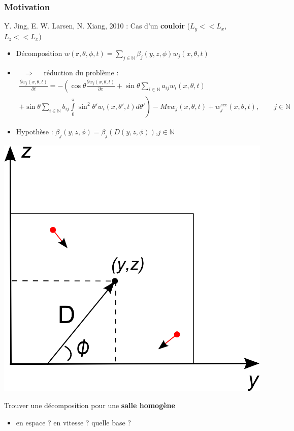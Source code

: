 \begin{frame}
\frametitle{Motivation}
Y. Jing, E. W. Larsen, N. Xiang, 2010 : Cas d'un \textbf{couloir} ($L_y<<L_x$, $L_z<<L_x$)
\begin{itemize}
\item Décomposition $w(\textbf{r}, \theta, \phi, t)=\sum\limits_{j\in\mathbb{N}}\beta_j(y,z,\phi)w_j(x,\theta,t)$ 
\item $\quad\Rightarrow\quad$ réduction du problème : 
\begin{multline*}
\frac{\partial w_{j}(x,\theta,t)}{\partial t}=-\left(\cos{\theta}\frac{\partial w_{j}(x,\theta,t)}{\partial x}+\sin{\theta}\sum\limits_{i\in\mathbb{N}}a_{ij}w_{i}(x,\theta,t)\right.\\
\left.+\sin{\theta}\sum\limits_{i\in\mathbb{N}}b_{ij}\int\limits_{0}^{\pi}\sin^2{\theta'}w_{i}(x,\theta',t)d\theta'\right)
-Mv w_{j}(x,\theta,t)+w^{sce}_{j}(x,\theta,t),\qquad j\in\mathbb{N}
\end{multline*}
\end{itemize}
\begin{minipage}{8cm}
\begin{itemize}
\item Hypothèse : $\beta_j(y,z,\phi)=\beta_j(D(y,z,\phi))$,\quad $j\in\mathbb{N}$
\end{itemize}
\vspace{1.5cm}
\end{minipage}
\hspace{0.5cm}
\begin{minipage}{3cm}
\includegraphics[scale=0.3]{Figures/D_seme.png}
\end{minipage}

Trouver une décomposition pour une \textbf{salle homogène}
\begin{itemize}
\item en espace ? en vitesse ? quelle base ?
\end{itemize}
\end{frame}

